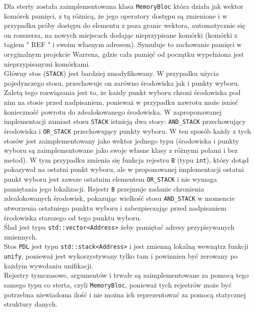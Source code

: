 Dla sterty została zaimplementowana klasa \texttt{MemoryBloc} która działa jak wektor komórek pamięci, z tą różnicą, że jego operatory dostępu są zmienione i w przypadku próby dostępu do elementu z poza granic wektora, automatycznie się on rozszerza, na nowych miejscach dodając nieprzypisane komórki (komórki z tagiem " REF " i swoim własnym adresem). Symuluje to zachowanie pamięci w oryginalnym projekcie Warrena, gdzie cała pamięć od początku wypełniona jest nieprzypisanymi komórkami.\\
Główny stos (\texttt{STACK}) jest bardziej zmodyfikowany. W przypadku użycia pojedynczego stosu, przechowuje on zarówno środowiska jak i punkty wyboru\cite{WAM}. Zaletą tego rozwiązania jest to, że każdy punkt wyboru chroni środowiska pod nim na stosie przed nadpisaniem, ponieważ w przypadku nawrotu może isnieć konieczność powrotu do zdealokowanego środowiska. W zaproponawanej implementacji zamiast stosu \texttt{STACK} istnieją dwa stosy: \texttt{AND\_STACK} przechowujący środowiska i \texttt{OR\_STACK} przechowujący punkty wyboru. W ten sposób każdy z tych stosów jest zaimplementowany jako wektor jednego typu (środowiska i punkty wyboru są zaimplementowane jako swoje własne klasy z różnymi polami i bez metod). W tym przypadku zmienia się funkcja rejestru \texttt{B} (typu \texttt{int}), który dotąd pokazywał na ostatni punkt wyboru, ale w proponowanej implementacji ostatni punkt wyboru jest zawsze ostatnim elementem \texttt{OR\_STACK} i nie wymaga pamiętania jego lokalizacji. Rejestr \texttt{B} przejmuje zadanie chronienia zdealokowanych środowisk, pokazując wielkość stosu \texttt{AND\_STACK} w momencie utworzenia ostatniego punktu wyboru i zabezpieczając przed nadpisaniem środowiska starszego od tego punktu wyboru.\\
Ślad jest typu \texttt{std::vector<Address>} żeby pamiętać adresy przypisywanych zmiennych.\\
Stos \texttt{PDL} jest typu \texttt{std::stack<Address>} i jest zmienną lokalną wewnątrz funkcji \texttt{unify}, ponieważ jest wykorzystywany tylko tam i powinnien być zerowany po każdym wywołaniu unifikacji.\\
Rejestry tymczasowe, argumentów i trwałe są zaimplementowane za pomocą tego samego typu co sterta, czyli \texttt{MemoryBloc}, ponieważ tych rejestrów może być potrzebna niewiadoma ilość i nie można ich reprezentować za pomocą statycznej struktury danych.\\

